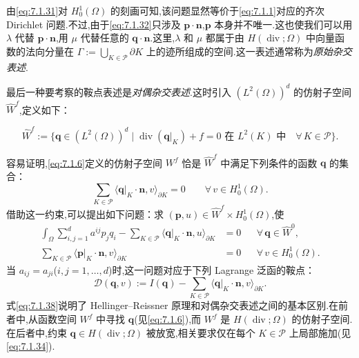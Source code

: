 由\eqref{eq:7.1.31}对 \(H_0^1(\Omega)\) 的刻画可知,该问题显然等价于\eqref{eq:7.1.1}对应的齐次 Dirichlet 问题.不过,由于\eqref{eq:7.1.32}只涉及 \(\boldsymbol{p}\cdot\boldsymbol{n}\),\(\boldsymbol{p}\) 本身并不唯一.这也使我们可以用 \(\lambda\) 代替 \(\boldsymbol{p}\cdot\boldsymbol{n}\),用 \(\mu\) 代替任意的 \(\boldsymbol{q}\cdot\boldsymbol{n}\).这里,\(\lambda\) 和 \(\mu\) 都属于由 \(H(\operatorname{div};\Omega)\) 中向量函数的法向分量在 \(\Gamma:=\bigcup_{K\in\mathcal P}\partial K\) 上的迹所组成的空间.这一表述通常称为\emph{原始杂交表述}.

最后一种要考察的鞍点表述是\emph{对偶杂交表述}.这时引入 \((L^2(\Omega))^d\) 的仿射子空间 \(\widehat W^f\),定义如下：
\begin{definition*}
\begin{equation}\label{eq:7.1.34}
  \widehat W^f:=\{\boldsymbol{q}\in(L^2(\Omega))^d\mid
     \operatorname{div}(\boldsymbol{q}|_K)+f=0\text{ 在 }L^2(K)\text{ 中}
     \quad\forall\,K\in\mathcal P\}.
\end{equation}
\end{definition*}
容易证明,\eqref{eq:7.1.6}定义的仿射子空间 \(W^f\) 恰是 \(\widehat W^f\) 中满足下列条件的函数 \(\boldsymbol{q}\) 的集合：
\begin{equation}\label{eq:7.1.35}
  \sum_{K\in\mathcal P}\langle\boldsymbol{q}|_K\cdot\boldsymbol{n},v\rangle_{\partial K}
     =0\qquad\forall\,v\in H_0^1(\Omega).
\end{equation}
借助这一约束,可以提出如下问题：求 \((\boldsymbol{p},u)\in\widehat W^f\times H_0^1(\Omega)\),使
\begin{align}
  \int_\Omega\sum_{i,j=1}^d a^{ij}p_jq_i
    -\sum_{K\in\mathcal P}\langle\boldsymbol{q}|_K\cdot\boldsymbol{n},u\rangle_{\partial K}
    &=0 &&\forall\,\boldsymbol{q}\in\widehat W^0,\label{eq:7.1.36}\\
  \sum_{K\in\mathcal P}\langle\boldsymbol{p}|_K\cdot\boldsymbol{n},v\rangle_{\partial K}
    &=0 &&\forall\,v\in H_0^1(\Omega).\label{eq:7.1.37}
\end{align}
当 \(a_{ij}=a_{ji}\)(\(i,j=1,\ldots,d\))时,这一问题对应于下列 Lagrange 泛函的鞍点：
\begin{equation}\label{eq:7.1.38}
  \mathcal D(\boldsymbol{q},v):=I(\boldsymbol{q})
     -\sum_{K\in\mathcal P}\langle\boldsymbol{q}|_K\cdot\boldsymbol{n},v\rangle_{\partial K}.
\end{equation}
式\eqref{eq:7.1.38}说明了 Hellinger--Reissner 原理和对偶杂交表述之间的基本区别.在前者中,从函数空间 \(W^f\) 中寻找 \(\boldsymbol{q}\)(见\eqref{eq:7.1.6}),而 \(W^f\) 是 \(H(\operatorname{div};\Omega)\) 的仿射子空间.在后者中,约束 \(\boldsymbol{q}\in H(\operatorname{div};\Omega)\) 被放宽,相关要求仅在每个 \(K\in\mathcal P\) 上局部施加(见\eqref{eq:7.1.34}).

